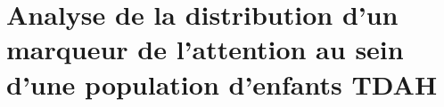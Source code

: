 \chapter{Analyse de la distribution d'un marqueur de l'attention au sein d'une population d'enfants TDAH}
